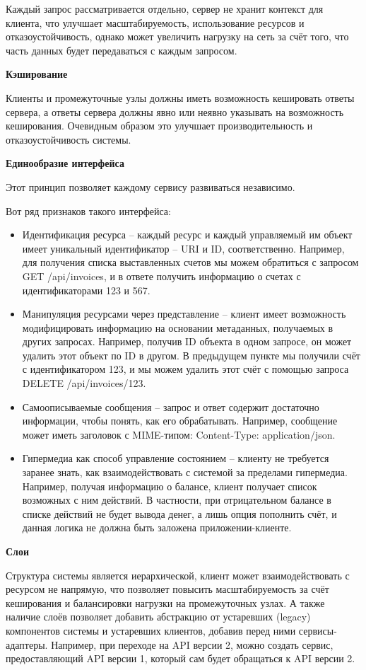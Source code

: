 Каждый запрос рассматривается отдельно, сервер не хранит контекст для клиента, что улучшает масштабируемость, использование ресурсов и отказоустойчивость, однако может увеличить нагрузку на сеть за счёт того, что часть данных будет передаваться с каждым запросом.

\textbf{Кэширование}

Клиенты и промежуточные узлы должны иметь возможность кешировать ответы сервера, а ответы сервера должны явно или неявно указывать на возможность кеширования.
Очевидным образом это улучшает производительность и отказоустойчивость системы.

\textbf{Единообразие интерфейса}

Этот принцип позволяет каждому сервису развиваться независимо.

Вот ряд признаков такого интерфейса:
\begin{itemize}
	\item Идентификация ресурса – каждый ресурс и каждый управляемый им объект имеет уникальный идентификатор – URI и ID, соответственно.
	Например, для получения списка выставленных счетов мы можем обратиться с запросом GET /api/invoices, и в ответе получить информацию о счетах с идентификаторами 123 и 567.
	\item Манипуляция ресурсами через представление – клиент имеет возможность модифицировать информацию на основании метаданных, получаемых в других запросах.
	Например, получив ID объекта в одном запросе, он может удалить этот объект по ID в другом.
	В предыдущем пункте мы получили счёт с идентификатором 123, и мы можем удалить этот счёт с помощью запроса DELETE /api/invoices/123.
	\item Самоописываемые сообщения – запрос и ответ содержит достаточно информации, чтобы понять, как его обрабатывать.
	Например, сообщение может иметь заголовок с MIME-типом: Content-Type: application/json.
	\item Гипермедиа как способ управление состоянием – клиенту не требуется заранее знать, как взаимодействовать с системой за пределами гипермедиа.
	Например, получая информацию о балансе, клиент получает список возможных с ним действий.
	В частности, при отрицательном балансе в списке действий не будет вывода денег, а лишь опция пополнить счёт, и данная логика не должна быть заложена приложении-клиенте.
\end{itemize}

\textbf{Слои}

Структура системы является иерархической, клиент может взаимодействовать с ресурсом не напрямую, что позволяет повысить масштабируемость за счёт кеширования и балансировки нагрузки на промежуточных узлах.
А также наличие слоёв позволяет добавить абстракцию от устаревших (legacy) компонентов системы и устаревших клиентов, добавив перед ними сервисы-адаптеры.
Например, при переходе на API версии 2, можно создать сервис, предоставляющий API версии 1, который сам будет обращаться к API версии 2.

